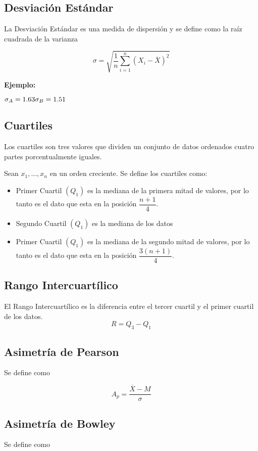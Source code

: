 \documentclass[10pt,a4paper]{article}
\begin{document}
\subsection{Desviación Estándar}

La Desviación Estándar es una medida de dispersión y se define como la raíz cuadrada de la varianza

$$ \sigma = \sqrt{ \dfrac{1}{n} \sum_{i = 1}^{n} \left(  X_i - \overline{X} \right) ^2  }$$
\begin{flushleft}
	\textbf{Ejemplo:}
\end{flushleft}
$
{\sigma_{A}} = 1.63\\
{\sigma_{B}} = 1.51
$

\subsection{Cuartiles}

Los cuartiles son tres valores que dividen un conjunto de datos ordenados cuatro partes porcentualmente iguales. 

Sean $x_{1}, \ldots,x_{n}$ en un orden creciente. Se define los cuartiles como:
\begin{itemize}
	\item Primer Cuartil $(Q_1)$ es la mediana de la primera mitad de valores, por lo tanto es el dato que esta en la posición $\dfrac{n + 1}{4}$.
	\item Segundo Cuartil $(Q_1)$ es la mediana de los datos
		\item Primer Cuartil $(Q_1)$ es la mediana de la segundo mitad de valores, por lo tanto es el dato que esta en la posición $\dfrac{3(n + 1)}{4}$.
\end{itemize}


\subsection{Rango Intercuartílico}

El Rango Intercuartílico es la diferencia entre el tercer cuartil y el primer cuartil de los datos.
$$R = Q_3 - Q_1$$

\subsection{Asimetría de Pearson}
 Se define como
 
$$ A_p = \dfrac{ \overline{X} - M }{ \sigma } $$


\subsection{Asimetría de Bowley}
Se define como
\end{document}
